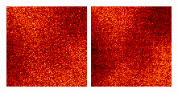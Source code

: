 \documentclass[tocnosub,noragright,centerchapter,12pt]{uiucecethesis09}
\begin{document}
\begin{figure}
{\begin{minipage}{.19\textwidth}
  \end{minipage}%
  \begin{minipage}{.19\textwidth}
    \centering
    \includegraphics[width=.95\textwidth]{figures/aia_recon_zoom10.png}
  \end{minipage}%
  \begin{minipage}{.19\textwidth}
    \centering
    \includegraphics[width=.95\textwidth]{figures/aia_recon_zoom20.png}

\end{minipage}}
\end{figure}
\end{document}
